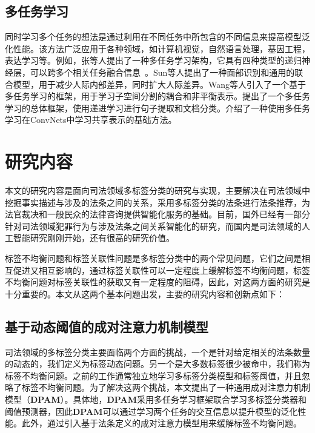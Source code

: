 \subsection{多任务学习}
同时学习多个任务的想法是通过利用在不同任务中所包含的不同信息来提高模型泛化性能。该方法广泛应用于各种领域，如计算机视觉\cite{Torralba2007Sharing, Yim2015Rotating, Zhang2013Robust}，自然语言处理\cite{Liu2017Adversarial, Glorot2011Domain, collobert2008unified, Liu2015Representation, luong2015multi}，基因工程\cite{Dong2014Inferring, Zhong2013User}，表达学习\cite{argyriou2007multi, Kang2011Learning, Zhang2010Probabilistic}等。例如，张等人提出了一种多任务学习架构，它具有四种类型的递归神经层，可以跨多个相关任务融合信息~\cite{Zhang2017A}。Sun等人提出了一种面部识别和通用的联合模型，用于减少人际内部差异，同时扩大人际差异\cite{Sun2014Deep}。Wang等人引入了一个基于多任务学习的框架，用于学习子空间分割的耦合和非平衡表示\cite{Wang2015Multi}。提出了一个多任务学习的总体框架，使用递进学习进行句子提取和文档分类\cite{Masaru2017Masaru}。介绍了一种使用多任务学习在ConvNets中学习共享表示的基础方法。

\section{研究内容}
本文的研究内容是面向司法领域多标签分类的研究与实现，主要解决在司法领域中挖掘事实描述与涉及的法条之间的关系，采用多标签分类的法条进行法条推荐，为法官裁决和一般民众的法律咨询提供智能化服务的基础。目前，国外已经有一部分针对司法领域犯罪行为与涉及法条之间关系智能化的研究，而国内是司法领域的人工智能研究刚刚开始，还有很高的研究价值。

标签不均衡问题和标签关联性问题是多标签分类中的两个常见问题，它们之间是相互促进又相互影响的，通过标签关联性可以一定程度上缓解标签不均衡问题，标签不均衡问题对标签关联性的获取又有一定程度的阻碍，因此，对这两方面的研究是十分重要的。本文从这两个基本问题出发，主要的研究内容和创新点如下：

\subsection{基于动态阈值的成对注意力机制模型}
司法领域的多标签分类主要面临两个方面的挑战，一个是针对给定相关的法条数量的动态的，我们定义为标签动态问题。另一个是大多数标签很少被命中，我们称为标签不均衡问题。之前的工作通常独立地学习多标签分类模型和标签阈值，并且忽略了标签不均衡问题。为了解决这两个挑战，本文提出了一种通用成对注意力机制模型（\textbf{DPAM}）。具体地，\textbf{DPAM}采用多任务学习框架联合学习多标签分类器和阈值预测器，因此\textbf{DPAM}可以通过学习两个任务的交互信息以提升模型的泛化性能。此外，通过引入基于法条定义的成对注意力模型用来缓解标签不均衡问题。
